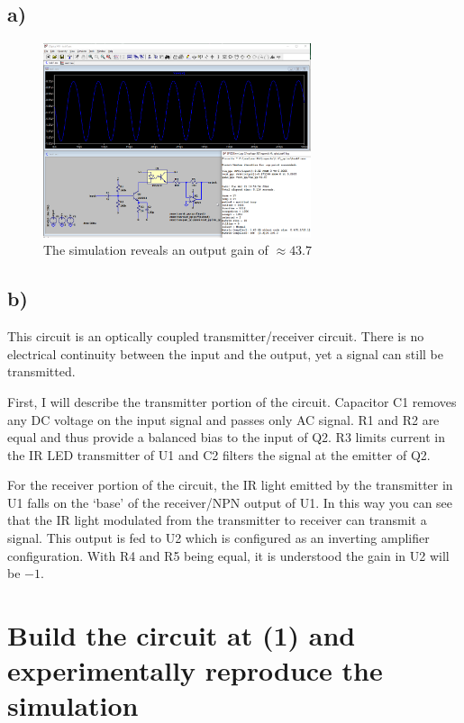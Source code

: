 \documentclass{article}
\begin{document}
	\subsection*{a)}
	
	\begin{figure}[H]
	    \centering
	    \includegraphics[width=0.7\textwidth]{1a}
	    \caption{The simulation reveals an output gain of $\approx 43.7$}
	\end{figure}

	\subsection*{b)}
	
	This circuit is an optically coupled transmitter/receiver circuit. There is no electrical continuity between the input and the output, yet a signal can still be transmitted.
	
	 First, I will describe the transmitter portion of the circuit. Capacitor C1 removes any DC voltage on the input signal and passes only AC signal. R1 and R2 are equal and thus provide a balanced bias to the input of Q2. R3 limits current in the IR LED transmitter of U1 and C2 filters the signal at the emitter of Q2. 
	
	For the receiver portion of the circuit, the IR light emitted by the transmitter in U1 falls on the `base' of the receiver/NPN output of U1. In this way you can see that the IR light modulated from the transmitter to receiver can transmit a signal. This output is fed to U2 which is configured as an inverting amplifier configuration. With R4 and R5 being equal, it is understood the gain in U2 will be $-1$.
	
	\section{Build the circuit at (1) and experimentally reproduce the simulation}    
\end{document}
